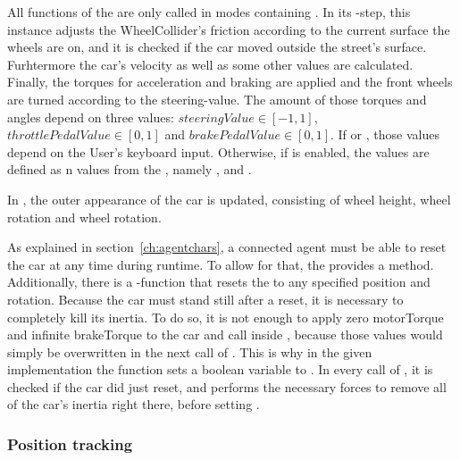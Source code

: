 All functions of the  are only called in modes containing . In its -step, this instance adjusts the WheelCollider's friction according to the current surface the wheels are on, and it is checked if the car moved outside the street's surface. Furhtermore the car's velocity as well as some other values are calculated. Finally, the torques for acceleration and braking are applied and the front wheels are turned according to the steering-value. The amount of those torques and angles depend on three values: $steeringValue \in [-1,1]$, $throttlePedalValue \in [0,1]$ and $brakePedalValue \in [0,1]$. If  or , those values depend on the User's keyboard input. Otherwise, if  is enabled, the values are defined as n values from the , namely ,  and .

In , the outer appearance of the car is updated, consisting of wheel height, wheel rotation and wheel rotation.

As explained in section~\ref{ch:agentchars}, a connected agent must be able to reset the car at any time during runtime. To allow for that, the  provides a  method. Additionally, there is a -function that resets the  to any specified position and rotation. Because the car must stand still after a reset, it is necessary to completely kill its inertia. To do so, it is not enough to apply zero motorTorque and infinite brakeTorque to the car and call  inside , because those values would simply be overwritten in the next call of . This is why in the given implementation the function  sets a boolean variable  to . In every call of , it is checked if the car did just reset, and performs the necessary forces to remove all of the car's inertia right there, before setting .




\subsubsection{Position tracking}

